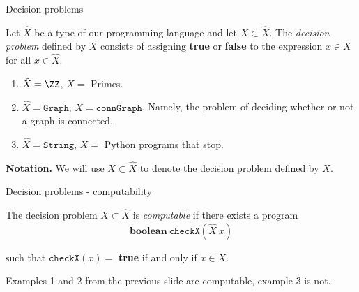 %

\begin{frame}{Decision problems}
	\begin{defn}
		Let $\hat{X}$ be a type of our programming language and let
		$X \subset \hat{X}$. The \emph{decision problem} defined by $X$ consists
		of assigning \textbf{true} or \textbf{false} to the expression $x \in X$
		for all $x \in \hat{X}$. 
	\end{defn}

	\pause
	\begin{exl}
		\begin{enumerate}
			\item $\hat{X}= \ZZ$, $X=$ Primes.\pause
			\item $\hat{X}= \mathtt{Graph}$, $X= \mathtt{connGraph}$. Namely,
				the problem of deciding whether or not a graph is
				connected.\pause
			\item $\hat{X}= \mathtt{String}$, $X=$ Python programs that stop.
		\end{enumerate}
	\end{exl}

	\pause
	\textbf{Notation.} We will use $X \subset \hat{X}$ to denote the decision problem
	defined by $X$.
\end{frame}

%

\begin{frame}{Decision problems - computability}
	\begin{defn}
		The decision problem $X \subset \hat{X}$ is \emph{computable} if there
		exists a program
		\[
			\mathbf{boolean}\ \mathtt{checkX}(\hat{X}\ x)
		\]

		such that \(\mathtt{checkX}(x) =\) \textbf{true} if and only if
		$x \in X$.
	\end{defn}

	\pause
	\begin{exl}
		Examples 1 and 2 from the previous slide are computable, example 3 is
		not.
	\end{exl}
\end{frame}

%

